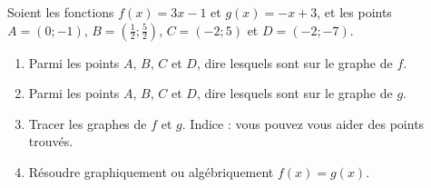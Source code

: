 
\begin{exercice}\label{exosmath-0016}

    Soient les fonctions \( f(x)=3x-1\) et \( g(x)=-x+3\), et les points \( A=(0;-1)\), \( B=(\frac{ 1 }{2};\frac{ 5 }{2})\), \( C=(-2;5)\) et \( D=(-2;-7)\).
    \begin{multicols}{2}
        \begin{enumerate}
            \item
                Parmi les points \( A\), \( B\), \( C\) et \( D\), dire lesquels sont sur le graphe de \( f\).
            \item
                Parmi les points \( A\), \( B\), \( C\) et \( D\), dire lesquels sont sur le graphe de \( g\).
            \item
                Tracer les graphes de \( f\) et \( g\). Indice : vous pouvez vous aider des points trouvés.
            \item
                Résoudre graphiquement ou algébriquement \( f(x)=g(x)\).
        \end{enumerate}
    \end{multicols}

\end{exercice}
